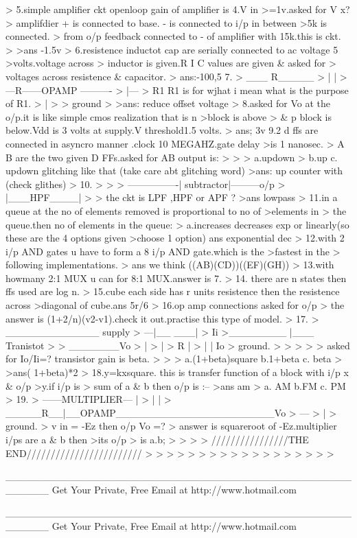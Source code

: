 >      5.simple amplifier ckt  openloop gain of amplifier is 4.V in 
>=1v.asked for V x?
>      amplifdier + is connected to base. - is connected to i/p in between 
>5k is connected.
>      from o/p feedback connected to - of amplifier with 15k.this is ckt.
>
>ans -1.5v
>      6.resistence inductot cap are serially connected to ac voltage 5 
>volts.voltage across
>      inductor is given.R I C values are given & asked for
>      voltages across resistence & capacitor.
>   ans:-100,5
   7.
>              ___  R_____
>             |            |
>      ---R------OPAMP ----------
>             |---
>             R1        R1 is for wjhat i mean what is the purpose of R1.
>             |
>
>             ground
>
>ans: reduce offset voltage
>     8.asked for Vo at the o/p.it is like simple cmos realization that is n 
>block is above
>     & p block is below.Vdd is 3 volts at supply.V threshold1.5 volts.
>     ans; 3v
9.2 d ffs are connected in asyncro manner .clock 10 MEGAHZ.gate delay 
>is 1 nanosec.
>     A B are the two given D FFs.asked for AB output is:
>
>
>     a.updown
>     b.up c. updown glitching like that (take care abt glitching word)
>ans: up counter with (check glithes)
>     10.
>
>
>     ----------------| subtractor|---------o/p
>         |___HPF____|
>
>                     the ckt is LPF ,HPF or APF ?
>ans lowpass
>   11.in a queue at the no of elements removed is proportional to no of 
>elements in
>   the queue.then no of elements in the queue:
>   a.increases decreases exp or linearly(so these are the 4 options given 
>choose 1 option)
ans exponential dec
>   12.with 2 i/p AND gates u have to form a 8 i/p AND gate.which is the 
>fastest in the
>   following implementations.
>   ans we think ((AB)(CD))((EF)(GH))
>   13.with howmany 2:1 MUX u can for   8:1 MUX.answer is 7.
>   14. there are n states then ffs used are log n.
>   15.cube each side has r units resistence then the resistence across 
>diagonal of cube.ans 5r/6
>   16.op amp connections asked for o/p
>   the answer is (1+2/n)(v2-v1).check it out.practise this type of model.
>   17.
>       _____________ supply
>   ---|__           ___|
>  Ii     >________ |___    Tranistot
>                       > _______Vo
>                        |
>                        |
>                        R       |
>                        |       |  Io
>                        ground.
>
>
>
>
>    asked for Io/Ii=? transistor gain is beta.
>
>
>    a.(1+beta)square b.1+beta  c. beta
>
>ans( 1+beta)*2
>    18.y=kxsquare. this is transfer function of a block with i/p x & o/p 
>y.if i/p is
>    sum of a & b then o/p is :--
>ans am
>    a. AM b.FM  c. PM
>    19.
>                 ------MULTIPLIER--- |
>                |                    |
>        _____R__|__OPAMP______________________Vo
>                 ---
>                 |
>                ground.
>                v in = -Ez then o/p Vo =?
>                answer is squareroot of -Ez.multiplier i/ps are a & b then 
>its o/p
>                is a.b;
>
>
>
>           ////////////////THE END////////////////////////
>
>
>
>
>
>
>
>
>
>
>
>
>
>
>
>
>
>


______________________________________________________
Get Your Private, Free Email at http://www.hotmail.com


______________________________________________________
Get Your Private, Free Email at http://www.hotmail.com

